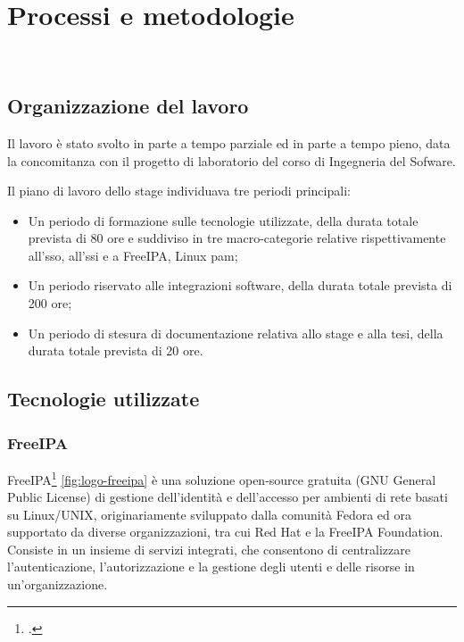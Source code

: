 
\chapter{Processi e metodologie}
\label{cap:processi-metodologie}

\\

\section{Organizzazione del lavoro}

Il lavoro è stato svolto in parte a tempo parziale ed in parte a tempo pieno, data la concomitanza con il progetto di laboratorio del corso di Ingegneria del Sofware. 

Il piano di lavoro dello stage individuava tre periodi principali:

\begin{itemize}
    \item Un periodo di formazione sulle tecnologie utilizzate, della durata totale prevista di 80 ore e suddiviso in tre macro-categorie relative rispettivamente all'\acrshort{sso}, all'\acrshort{ssi} e a FreeIPA, Linux \acrshort{pam};
    \item Un periodo riservato alle integrazioni software, della durata totale prevista di 200 ore;
    \item Un periodo di stesura di documentazione relativa allo stage e alla tesi, della durata totale prevista di 20 ore.
\end{itemize}




\section{Tecnologie utilizzate}
\subsection{FreeIPA}
FreeIPA\footcite{site:freeipa-website} \autoref{fig:logo-freeipa} è una soluzione open-source gratuita (GNU General Public License) di gestione dell'identità e dell'accesso per ambienti di rete basati su Linux/UNIX, originariamente sviluppato dalla comunità Fedora ed ora supportato da diverse organizzazioni, tra cui Red Hat e la FreeIPA Foundation. Consiste in un insieme di servizi integrati, che consentono di centralizzare l'autenticazione, l'autorizzazione e la gestione degli utenti e delle risorse in un'organizzazione.


